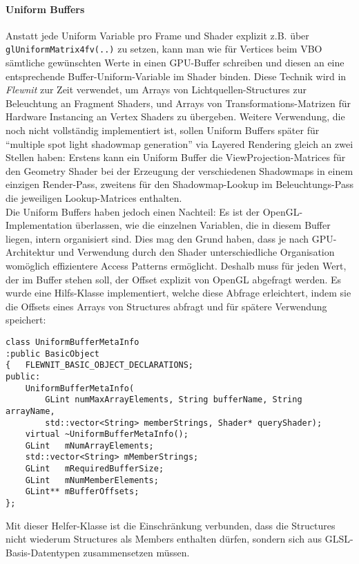 	\paragraph{Uniform Buffers}
	\label{sec:uniformBuffers}
	Anstatt jede Uniform Variable pro Frame und Shader explizit z.B. über \lstinline|glUniformMatrix4fv(..)|
	zu setzen, kann man wie für Vertices beim VBO sämtliche gewünschten Werte in einen GPU-Buffer schreiben
	und diesen an eine entsprechende Buffer-Uniform-Variable im Shader binden.
	Diese Technik wird in \emph{Flewnit} zur Zeit verwendet, um Arrays von Lichtquellen-Structures
	zur Beleuchtung an Fragment Shaders, und Arrays von Transformations-Matrizen
	für Hardware Instancing an Vertex Shaders zu übergeben. Weitere Verwendung, die noch nicht vollständig implementiert 
	ist, sollen Uniform Buffers	später für "`multiple spot light shadowmap generation"' via Layered Rendering gleich an 
	zwei Stellen haben:
	Erstens kann ein Uniform Buffer die ViewProjection-Matrices für den Geometry Shader bei der
	Erzeugung der verschiedenen Shadowmaps in einem einzigen Render-Pass, zweitens für den Shadowmap-Lookup
	im Beleuchtungs-Pass die jeweiligen Lookup-Matrices enthalten.\\
	
	Die Uniform Buffers haben jedoch einen Nachteil: Es ist der OpenGL-Implementation überlassen, wie die einzelnen
	Variablen, die in diesem Buffer liegen, intern organisiert sind. Dies mag den Grund haben, dass je nach GPU-
	Architektur und Verwendung durch den Shader unterschiedliche Organisation womöglich effizientere
	Access Patterns ermöglicht. Deshalb muss für jeden Wert, der im Buffer stehen soll, der Offset
	explizit von OpenGL abgefragt werden. Es wurde eine Hilfs-Klasse implementiert, welche diese Abfrage erleichtert,
	indem sie die Offsets eines Arrays von Structures abfragt und für spätere Verwendung speichert:
	\begin{lstlisting}
class UniformBufferMetaInfo
:public BasicObject
{	FLEWNIT_BASIC_OBJECT_DECLARATIONS;
public:
	UniformBufferMetaInfo(	
		GLint numMaxArrayElements, String bufferName, String arrayName, 
		std::vector<String> memberStrings, Shader* queryShader);
	virtual ~UniformBufferMetaInfo();
	GLint	mNumArrayElements; 
	std::vector<String> mMemberStrings;
	GLint 	mRequiredBufferSize;
	GLint	mNumMemberElements;
	GLint** mBufferOffsets;
};
	\end{lstlisting}
	Mit dieser Helfer-Klasse ist die Einschränkung verbunden, dass die Structures nicht wiederum Structures 
	als Members enthalten dürfen, sondern sich aus GLSL-Basis-Datentypen zusammensetzen müssen.\\
	
